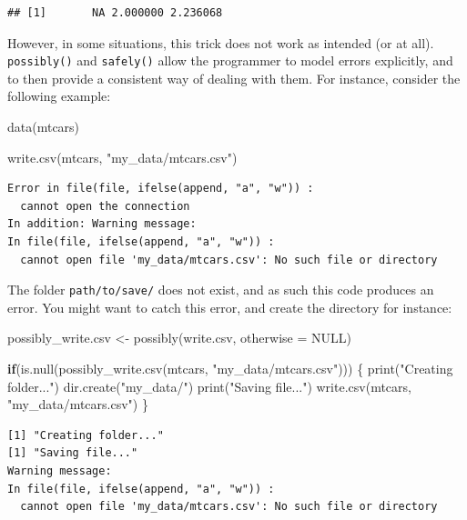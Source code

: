 \documentclass[
]{article}
\newenvironment{Shaded}{\begin{snugshade}}{\end{snugshade}}
\newcommand{\AttributeTok}[1]{\textcolor[rgb]{0.77,0.63,0.00}{#1}}
\newcommand{\ConstantTok}[1]{\textcolor[rgb]{0.00,0.00,0.00}{#1}}
\newcommand{\ControlFlowTok}[1]{\textcolor[rgb]{0.13,0.29,0.53}{\textbf{#1}}}
\newcommand{\FunctionTok}[1]{\textcolor[rgb]{0.00,0.00,0.00}{#1}}
\newcommand{\NormalTok}[1]{#1}
\newcommand{\OtherTok}[1]{\textcolor[rgb]{0.56,0.35,0.01}{#1}}
\newcommand{\StringTok}[1]{\textcolor[rgb]{0.31,0.60,0.02}{#1}}
\begin{document}
\begin{verbatim}
## [1]       NA 2.000000 2.236068
\end{verbatim}

However, in some situations, this trick does not work as intended (or at all). \texttt{possibly()} and
\texttt{safely()} allow the programmer to model errors explicitly, and to then provide a consistent way
of dealing with them. For instance, consider the following example:

\begin{Shaded}
\begin{Highlighting}[]
\FunctionTok{data}\NormalTok{(mtcars)}

\FunctionTok{write.csv}\NormalTok{(mtcars, }\StringTok{"my\_data/mtcars.csv"}\NormalTok{)}
\end{Highlighting}
\end{Shaded}

\begin{verbatim}
Error in file(file, ifelse(append, "a", "w")) : 
  cannot open the connection
In addition: Warning message:
In file(file, ifelse(append, "a", "w")) :
  cannot open file 'my_data/mtcars.csv': No such file or directory
\end{verbatim}

The folder \texttt{path/to/save/} does not exist, and as such this code produces an error. You might
want to catch this error, and create the directory for instance:

\begin{Shaded}
\begin{Highlighting}[]
\NormalTok{possibly\_write.csv }\OtherTok{\textless{}{-}} \FunctionTok{possibly}\NormalTok{(write.csv, }\AttributeTok{otherwise =} \ConstantTok{NULL}\NormalTok{)}

\ControlFlowTok{if}\NormalTok{(}\FunctionTok{is.null}\NormalTok{(}\FunctionTok{possibly\_write.csv}\NormalTok{(mtcars, }\StringTok{"my\_data/mtcars.csv"}\NormalTok{))) \{}
  \FunctionTok{print}\NormalTok{(}\StringTok{"Creating folder..."}\NormalTok{)}
  \FunctionTok{dir.create}\NormalTok{(}\StringTok{"my\_data/"}\NormalTok{)}
  \FunctionTok{print}\NormalTok{(}\StringTok{"Saving file..."}\NormalTok{)}
  \FunctionTok{write.csv}\NormalTok{(mtcars, }\StringTok{"my\_data/mtcars.csv"}\NormalTok{)}
\NormalTok{\}}
\end{Highlighting}
\end{Shaded}

\begin{verbatim}
[1] "Creating folder..."
[1] "Saving file..."
Warning message:
In file(file, ifelse(append, "a", "w")) :
  cannot open file 'my_data/mtcars.csv': No such file or directory
\end{verbatim}
\end{document}
